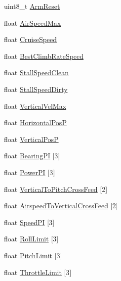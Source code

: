 \begin{DoxyCompactItemize}
uint8\-\_\-t \hyperlink{struct____attribute_____ae48143a7ddd8553b39bdba58ab9103ff}{\-Arm\-Reset}
\item 
float \hyperlink{struct____attribute_____a271b5650008ba4868d5fd3d0e50b9190}{\-Air\-Speed\-Max}
\item 
float \hyperlink{struct____attribute_____a0e4e264399d016c48cec091900137852}{\-Cruise\-Speed}
\item 
float \hyperlink{struct____attribute_____a631842c995595027aa7e8c408d5debd1}{\-Best\-Climb\-Rate\-Speed}
\item 
float \hyperlink{struct____attribute_____aeb2b2184ca98f75bed476cd35be170f0}{\-Stall\-Speed\-Clean}
\item 
float \hyperlink{struct____attribute_____a02fd497626f543f9c15f5f7a439e0b67}{\-Stall\-Speed\-Dirty}
\item 
float \hyperlink{struct____attribute_____a7b8167689ee7323295141130ff24865d}{\-Vertical\-Vel\-Max}
\item 
float \hyperlink{struct____attribute_____a0aec3de4e46f73750728f57628963926}{\-Horizontal\-Pos\-P}
\item 
float \hyperlink{struct____attribute_____a51dd6a69f5fd020059291f5b2cdf6880}{\-Vertical\-Pos\-P}
\item 
float \hyperlink{struct____attribute_____a2edc0af8e86ce9634547ae9fc99f3dea}{\-Bearing\-P\-I} \mbox{[}3\mbox{]}
\item 
float \hyperlink{struct____attribute_____a296acdb41fab2c3b8e30f0af8bd8f065}{\-Power\-P\-I} \mbox{[}3\mbox{]}
\item 
float \hyperlink{struct____attribute_____ad9fc0be654bdc5b0336662a74911107a}{\-Vertical\-To\-Pitch\-Cross\-Feed} \mbox{[}2\mbox{]}
\item 
float \hyperlink{struct____attribute_____a1ac0e03d68cdb25e8836c96d77b2bd61}{\-Airspeed\-To\-Vertical\-Cross\-Feed} \mbox{[}2\mbox{]}
\item 
float \hyperlink{struct____attribute_____a2bb19864cbf62e170b6009b175df813b}{\-Speed\-P\-I} \mbox{[}3\mbox{]}
\item 
float \hyperlink{struct____attribute_____a411633d0490b74fbdbb6513a02c70218}{\-Roll\-Limit} \mbox{[}3\mbox{]}
\item 
float \hyperlink{struct____attribute_____a676eaae4863b8f29f4f3c3258c963c9d}{\-Pitch\-Limit} \mbox{[}3\mbox{]}
\item 
float \hyperlink{struct____attribute_____a1bce105aa91fc080bf5f1b1e75f5751b}{\-Throttle\-Limit} \mbox{[}3\mbox{]}
\item 

\end{DoxyCompactItemize}
